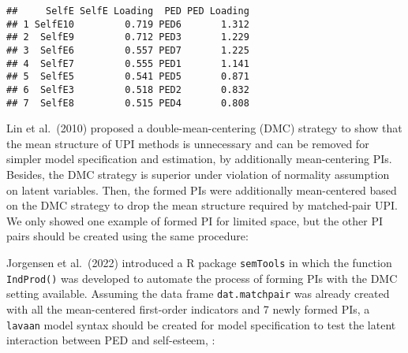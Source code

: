 \documentclass[
  man]{apa7}
\newenvironment{Shaded}{\begin{snugshade}}{\end{snugshade}}
\newcommand{\AttributeTok}[1]{\textcolor[rgb]{0.13,0.29,0.53}{#1}}
\newcommand{\CommentTok}[1]{\textcolor[rgb]{0.56,0.35,0.01}{\textit{#1}}}
\newcommand{\FunctionTok}[1]{\textcolor[rgb]{0.13,0.29,0.53}{\textbf{#1}}}
\newcommand{\NormalTok}[1]{#1}
\newcommand{\OtherTok}[1]{\textcolor[rgb]{0.56,0.35,0.01}{#1}}
\newcommand{\SpecialCharTok}[1]{\textcolor[rgb]{0.81,0.36,0.00}{\textbf{#1}}}
\begin{document}
\footnotesize

\begin{verbatim}
##     SelfE SelfE Loading  PED PED Loading
## 1 SelfE10         0.719 PED6       1.312
## 2  SelfE9         0.712 PED3       1.229
## 3  SelfE6         0.557 PED7       1.225
## 4  SelfE7         0.555 PED1       1.141
## 5  SelfE5         0.541 PED5       0.871
## 6  SelfE3         0.518 PED2       0.832
## 7  SelfE8         0.515 PED4       0.808
\end{verbatim}

\normalsize
Lin et al.~(2010) proposed a double-mean-centering (DMC) strategy to show that the mean structure of UPI methods is unnecessary and can be removed for simpler model specification and estimation, by additionally mean-centering PIs. Besides, the DMC strategy is superior under violation of normality assumption on latent variables. Then, the formed PIs were additionally mean-centered based on the DMC strategy to drop the mean structure required by matched-pair UPI. We only showed one example of formed PI for limited space, but the other PI pairs should be created using the same procedure:

\footnotesize

\begin{Shaded}
\end{Shaded}

\normalsize

Jorgensen et al.~(2022) introduced a R package \texttt{semTools} in which the function \texttt{IndProd()} was developed to automate the process of forming PIs with the DMC setting available. Assuming the data frame \texttt{dat.matchpair} was already created with all the mean-centered first-order indicators and 7 newly formed PIs, a \texttt{lavaan} model syntax should be created for model specification to test the latent interaction between PED and self-esteem, :

\footnotesize
\end{document}
